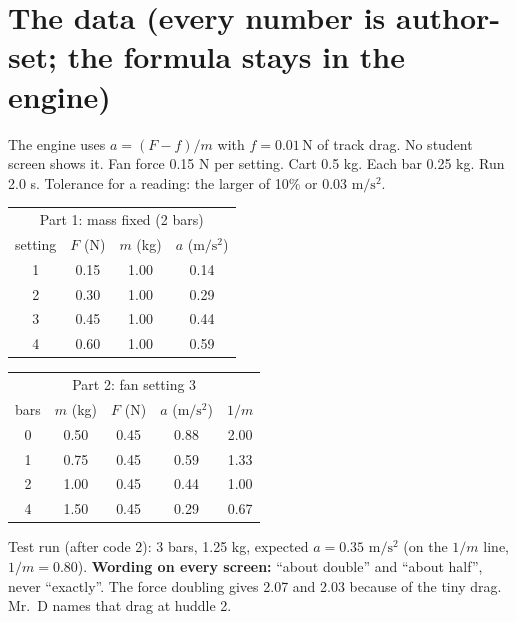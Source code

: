 \documentclass[10pt]{article}
\begin{document}
\section{The data (every number is author-set; the formula stays in the engine)}
The engine uses $a=(F-f)/m$ with $f=0.01\,\mathrm{N}$ of track drag. No student screen shows it. Fan force 0.15 N per setting. Cart 0.5 kg. Each bar 0.25 kg. Run 2.0 s. Tolerance for a reading: the larger of 10\% or 0.03 \ensuremath{\mathrm{m/s^2}}.
\begin{center}\begin{tabular}[t]{@{}c c c c@{}}\toprule \multicolumn{4}{c}{Part 1: mass fixed (2 bars)}\\ setting & $F$ (N) & $m$ (kg) & $a$ (\ensuremath{\mathrm{m/s^2}})\\\midrule
1 & 0.15 & 1.00 & 0.14 \\
2 & 0.30 & 1.00 & 0.29 \\
3 & 0.45 & 1.00 & 0.44 \\
4 & 0.60 & 1.00 & 0.59 \\
\bottomrule\end{tabular}\qquad\begin{tabular}[t]{@{}c c c c c@{}}\toprule \multicolumn{5}{c}{Part 2: fan setting 3}\\ bars & $m$ (kg) & $F$ (N) & $a$ (\ensuremath{\mathrm{m/s^2}}) & $1/m$\\\midrule
0 & 0.50 & 0.45 & 0.88 & 2.00 \\
1 & 0.75 & 0.45 & 0.59 & 1.33 \\
2 & 1.00 & 0.45 & 0.44 & 1.00 \\
4 & 1.50 & 0.45 & 0.29 & 0.67 \\
\bottomrule\end{tabular}\end{center}
Test run (after code 2): 3 bars, 1.25 kg, expected $a=0.35$ \ensuremath{\mathrm{m/s^2}} (on the $1/m$ line, $1/m=0.80$). \textbf{Wording on every screen:} “about double” and “about half”, never “exactly”. The force doubling gives 2.07 and 2.03 because of the tiny drag. Mr.\ D names that drag at huddle 2.
\end{document}
